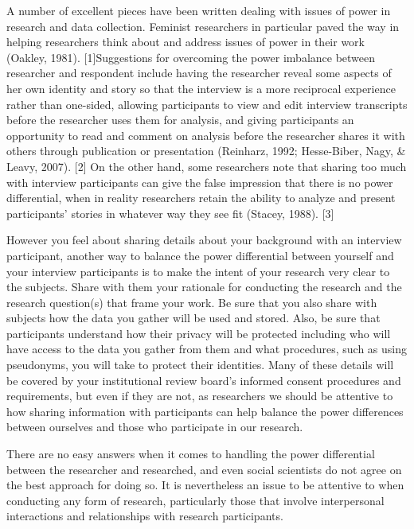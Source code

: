 A number of excellent pieces have been written dealing with issues of power in research and data collection. Feminist researchers in particular paved the way in helping researchers think about and address issues of power in their work (Oakley, 1981). [1]Suggestions for overcoming the power imbalance between researcher and respondent include having the researcher reveal some aspects of her own identity and story so that the interview is a more reciprocal experience rather than one-sided, allowing participants to view and edit interview transcripts before the researcher uses them for analysis, and giving participants an opportunity to read and comment on analysis before the researcher shares it with others through publication or presentation (Reinharz, 1992; Hesse-Biber, Nagy, \& Leavy, 2007). [2] On the other hand, some researchers note that sharing too much with interview participants can give the false impression that there is no power differential, when in reality researchers retain the ability to analyze and present participants’ stories in whatever way they see fit (Stacey, 1988). [3]

However you feel about sharing details about your background with an interview participant, another way to balance the power differential between yourself and your interview participants is to make the intent of your research very clear to the subjects. Share with them your rationale for conducting the research and the research question(s) that frame your work. Be sure that you also share with subjects how the data you gather will be used and stored. Also, be sure that participants understand how their privacy will be protected including who will have access to the data you gather from them and what procedures, such as using pseudonyms, you will take to protect their identities. Many of these details will be covered by your institutional review board’s informed consent procedures and requirements, but even if they are not, as researchers we should be attentive to how sharing information with participants can help balance the power differences between ourselves and those who participate in our research.

There are no easy answers when it comes to handling the power differential between the researcher and researched, and even social scientists do not agree on the best approach for doing so. It is nevertheless an issue to be attentive to when conducting any form of research, particularly those that involve interpersonal interactions and relationships with research participants.

